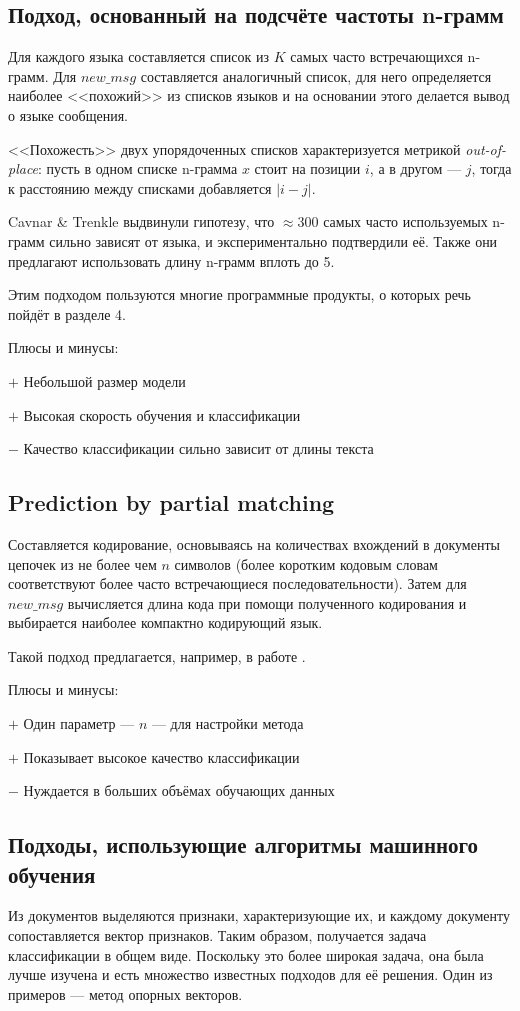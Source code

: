 \documentclass[a4paper, 14pt]{article}
\begin{document}
		\subsection{Подход, основанный на подсчёте частоты n-грамм}
		Для каждого языка составляется список из $K$ самых часто встречающихся n-грамм. Для $new\_msg$ составляется аналогичный список, для него
		определяется наиболее <<похожий>> из списков языков
		и на основании этого делается вывод о языке сообщения. 
		
		<<Похожесть>> двух упорядоченных списков характеризуется метрикой \textit{out-of-place}: 
		пусть в одном списке n-грамма $x$ стоит на позиции $i$, а в другом \nolinebreak --- $j$, тогда к расстоянию между списками добавляется $|i - j|$.
		
		
		Cavnar \& Trenkle выдвинули гипотезу, что $ \approx 300$ самых часто используемых n-грамм сильно зависят
		от языка, и экспериментально подтвердили её. Также они предлагают использовать длину n-грамм вплоть до 5.
		
		Этим подходом пользуются многие программные продукты, о которых речь пойдёт
		в разделе 4.
		
		\noindent Плюсы и минусы:
		
		
		$+$ Небольшой размер модели
		
		$+$ Высокая скорость обучения и классификации
		
		$-$ Качество классификации сильно зависит от длины текста
		
		\subsection{Prediction by partial matching}
		Составляется кодирование, основываясь на количествах вхождений в документы цепочек из не более чем $n$ символов (более коротким кодовым словам соответствуют более часто встречающиеся последовательности). Затем для $new\_msg$ вычисляется длина кода при помощи полученного кодирования и выбирается наиболее
		компактно кодирующий язык.
		
		Такой подход предлагается, например, в работе \cite{ppm}.
		
		\noindent Плюсы и минусы:
		
		$+$ 	Один параметр --- $n$ --- для настройки метода
		
		$+$ Показывает высокое качество классификации
		
		$-$ Нуждается в больших объёмах обучающих данных
		
		\subsection{Подходы, использующие алгоритмы машинного обучения}
		Из документов выделяются признаки, характеризующие их, и каждому документу сопоставляется вектор признаков. 
		Таким образом, получается задача классификации в общем виде. Поскольку это более широкая задача, она была
		лучше изучена и есть множество известных подходов для её решения. Один из примеров --- 
		метод опорных векторов.
		 
\end{document}
